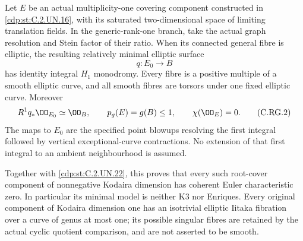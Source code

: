 \begin{proposition}\label{cdp:st:C.2.UN.29}

Let $E$ be an actual multiplicity-one covering component
constructed in \ref{cdp:st:C.2.UN.16}, with its saturated two-dimensional
space of limiting translation fields. In the generic-rank-one
branch, take the actual graph resolution and Stein factor
of their ratio. When its connected general fibre is elliptic,
the resulting relatively minimal elliptic surface
\[
                         q:E_0\longrightarrow B
                                                               \tag{C.RG.1}\label{cdp:eq:C.RG.1}
\]
has identity integral $H_1$ monodromy. Every fibre is a
positive multiple of a smooth elliptic curve, and all smooth
fibres are torsors under one fixed elliptic curve. Moreover
\[
 R^1q_*\OO_{E_0}\simeq\OO_B,\qquad
 p_g(E)=g(B)\le1,\qquad \chi(\OO_E)=0.
                                                               \tag{C.RG.2}\label{cdp:eq:C.RG.2}
\]
The maps to $E_0$ are the specified point blowups resolving
the first integral followed by vertical exceptional-curve
contractions. No extension of that first integral to an
ambient neighbourhood is assumed.

Together with \ref{cdp:st:C.2.UN.22}, this proves that every such root-cover
component of nonnegative Kodaira dimension has coherent
Euler characteristic zero. In particular its minimal model
is neither K3 nor Enriques. Every original component of
Kodaira dimension one has an isotrivial elliptic Iitaka
fibration over a curve of genus at most one; its possible
singular fibres are retained by the actual cyclic quotient
comparison, and are not asserted to be smooth.
\end{proposition}

